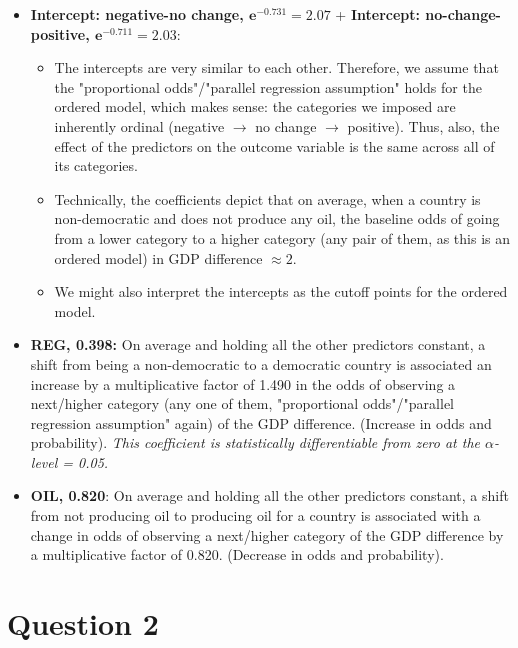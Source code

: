 \documentclass[12pt,letterpaper]{article}
\begin{document}
\begin{itemize}
	\item \textbf{Intercept: negative-no change, \( \mathbf{e^{-0.731} = 2.07} \)} + \textbf{Intercept: no-change-positive, \( \mathbf{e^{-0.711} = 2.03} \)}: 
 \begin{itemize}
        \item The intercepts are very similar to each other. Therefore, we assume that the "proportional odds"/"parallel regression assumption" holds for the ordered model, which makes sense: the categories we imposed are inherently ordinal (negative $\rightarrow$ no change $\rightarrow$ positive). Thus, also, the effect of the predictors on the outcome variable is the same across all of its categories. 
        \item Technically, the coefficients depict that on average, when a country is non-democratic and does not produce any oil, the baseline odds of going from a lower category to a higher category (any pair of them, as this is an ordered model) in GDP difference $\approx 2$. 
        \item We might also interpret the intercepts as the cutoff points for the ordered model.
    \end{itemize} 
 
	\item \textbf{REG, 0.398:} On average and holding all the other predictors constant, a shift from being a non-democratic to a democratic country is associated an increase by a multiplicative factor of 1.490 in the odds of observing a next/higher category (any one of them, "proportional odds"/"parallel regression assumption" again) of the GDP difference. (Increase in odds and probability).
\textit{This coefficient is statistically differentiable from zero at the $\alpha$-level = 0.05.  }
	\item \textbf{OIL, 0.820}: On average and holding all the other predictors constant, a shift from not producing oil to producing oil for a country is associated with a change in odds of observing a next/higher category of the GDP difference by a multiplicative factor of 0.820. (Decrease in odds and probability).
\end{itemize}

\section*{Question 2} 
\vspace{.25cm}
\end{document}
